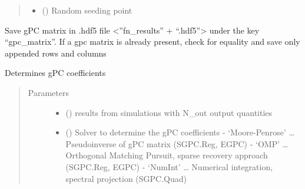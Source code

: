\documentclass[letterpaper,10pt,english,openany,oneside]{sphinxmanual}
\begin{document}
\begin{fulllineitems}
\begin{fulllineitems}
\begin{quote}
\begin{description}
\begin{itemize}
\item {} 
 (\sphinxstyleliteralemphasis{\sphinxupquote{, }}\sphinxstyleliteralemphasis{\sphinxupquote{, }}) \textendash{} Random seeding point

\end{itemize}

\end{description}\end{quote}

\end{fulllineitems}


\begin{fulllineitems}
\label{\detokenize{pygpc:pygpc.GPC.GPC.save_gpc_matrix_hdf5}}
Save gPC matrix in .hdf5 file \textless{}”fn\_results” + “.hdf5”\textgreater{} under the key “gpc\_matrix”.
If a gpc matrix is already present, check for equality and save only appended rows and columns

\end{fulllineitems}


\begin{fulllineitems}
\label{\detokenize{pygpc:pygpc.GPC.GPC.solve}}
Determines gPC coefficients
\begin{quote}\begin{description}
\item[{Parameters}] \leavevmode\begin{itemize}
\item {} 
 (\sphinxstyleliteralemphasis{\sphinxupquote{{[}}}\sphinxstyleliteralemphasis{\sphinxupquote{{]} }}) \textendash{} results from simulations with N\_out output quantities

\item {} 
 () \textendash{} Solver to determine the gPC coefficients
- ‘Moore-Penrose’ … Pseudoinverse of gPC matrix (SGPC.Reg, EGPC)
- ‘OMP’ … Orthogonal Matching Pursuit, sparse recovery approach (SGPC.Reg, EGPC)
- ‘NumInt’ … Numerical integration, spectral projection (SGPC.Quad)


\end{itemize}
\end{description}
\end{quote}
\end{fulllineitems}
\end{fulllineitems}
\end{document}
